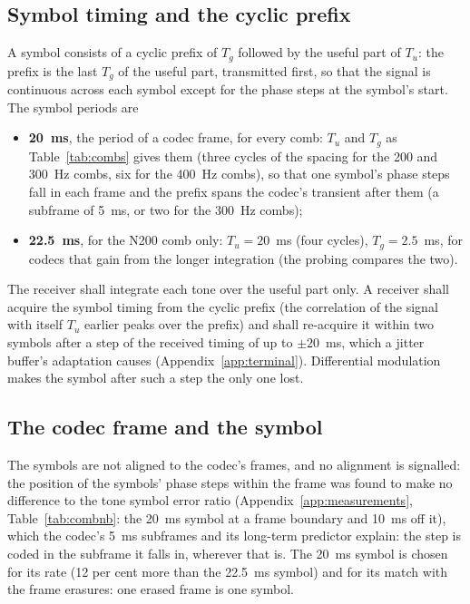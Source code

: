 \subsection{Symbol timing and the cyclic prefix}\label{sec:timing}
A symbol consists of a cyclic prefix of $T_g$ followed by the useful part
of $T_u$: the prefix is the last $T_g$ of the useful part, transmitted
first, so that the signal is continuous across each symbol except for the
phase steps at the symbol's start.  The symbol periods are
\begin{itemize}
\item \textbf{20~ms}, the period of a codec frame, for every comb: $T_u$
  and $T_g$ as Table~\ref{tab:combs} gives them (three cycles of the
  spacing for the 200 and 300~Hz combs, six for the 400~Hz combs), so
  that one symbol's phase steps fall in each frame and the prefix spans
  the codec's transient after them (a subframe of 5~ms, or two for the
  300~Hz combs);
\item \textbf{22.5~ms}, for the N200 comb only: $T_u = 20$~ms (four
  cycles), $T_g = 2.5$~ms, for codecs that gain from the longer integration
  (the probing compares the two).
\end{itemize}
The receiver shall integrate each tone over the useful part only.  A
receiver shall acquire the symbol timing from the cyclic prefix (the
correlation of the signal with itself $T_u$ earlier peaks over the prefix)
and shall re-acquire it within two symbols after a step of the received
timing of up to $\pm 20$~ms, which a jitter buffer's adaptation causes
(Appendix~\ref{app:terminal}).  Differential modulation makes the symbol
after such a step the only one lost.

\subsection{The codec frame and the symbol}\label{sec:align}
The symbols are not aligned to the codec's frames, and no alignment is
signalled: the position of the symbols' phase steps within the frame was
found to make no difference to the tone symbol error ratio
(Appendix~\ref{app:measurements}, Table~\ref{tab:combnb}: the 20~ms
symbol at a frame boundary and 10~ms off it), which the codec's 5~ms
subframes and its long-term predictor explain: the step is coded in the
subframe it falls in, wherever that is.  The 20~ms symbol is chosen for
its rate (12 per cent more than the 22.5~ms symbol) and for its match
with the frame erasures: one erased frame is one symbol.

